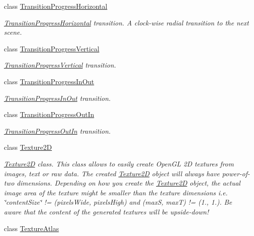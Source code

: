 \begin{DoxyCompactItemize}
class \hyperlink{classTransitionProgressHorizontal}{Transition\+Progress\+Horizontal}
\begin{DoxyCompactList}\small\item\em \hyperlink{classTransitionProgressHorizontal}{Transition\+Progress\+Horizontal} transition. A clock-\/wise radial transition to the next scene. \end{DoxyCompactList}\item 
class \hyperlink{classTransitionProgressVertical}{Transition\+Progress\+Vertical}
\begin{DoxyCompactList}\small\item\em \hyperlink{classTransitionProgressVertical}{Transition\+Progress\+Vertical} transition. \end{DoxyCompactList}\item 
class \hyperlink{classTransitionProgressInOut}{Transition\+Progress\+In\+Out}
\begin{DoxyCompactList}\small\item\em \hyperlink{classTransitionProgressInOut}{Transition\+Progress\+In\+Out} transition. \end{DoxyCompactList}\item 
class \hyperlink{classTransitionProgressOutIn}{Transition\+Progress\+Out\+In}
\begin{DoxyCompactList}\small\item\em \hyperlink{classTransitionProgressOutIn}{Transition\+Progress\+Out\+In} transition. \end{DoxyCompactList}\item 
class \hyperlink{classTexture2D}{Texture2D}
\begin{DoxyCompactList}\small\item\em \hyperlink{classTexture2D}{Texture2D} class. This class allows to easily create Open\+GL 2D textures from images, text or raw data. The created \hyperlink{classTexture2D}{Texture2D} object will always have power-\/of-\/two dimensions. Depending on how you create the \hyperlink{classTexture2D}{Texture2D} object, the actual image area of the texture might be smaller than the texture dimensions i.\+e. \char`\"{}content\+Size\char`\"{} != (pixels\+Wide, pixels\+High) and (maxS, maxT) != (1., 1.). Be aware that the content of the generated textures will be upside-\/down! \end{DoxyCompactList}\item 
class \hyperlink{classTextureAtlas}{Texture\+Atlas}

\end{DoxyCompactItemize}
